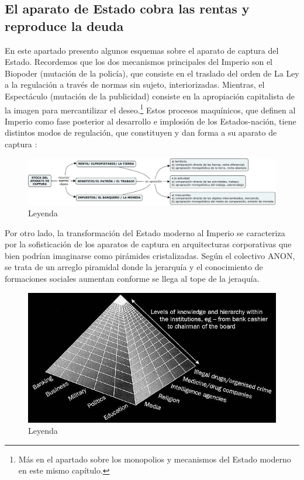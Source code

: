 \subsection{El aparato de Estado cobra las rentas y reproduce la deuda}
\label{sub:el-aparato-de-estado}

En este apartado presento algunos esquemas sobre el aparato de captura del Estado. Recordemos que los dos mecanismos principales del Imperio son el Biopoder (mutación de la policía), que consiste en el traslado del orden de La Ley a la regulación a través de normas sin sujeto, interiorizadas. Mientras, el Espectáculo (mutación de la publicidad) consiste en la apropiación capitalista de la imagen para mercantilizar el deseo.\footnote{Más en el apartado sobre los monopolios y mecanismos del Estado moderno en este mismo capítulo.} Estos procesos maquínicos, que definen al Imperio como fase posterior al desarrollo e implosión de los Estados-nación, tiene distintos modos de regulación, que constituyen y dan forma a su aparato de captura \autocite{deleuzeMilMesetasCapitalismo2002}:

\begin{figure}[htb]
  \centering
  \includegraphics[width=0.7\linewidth]{images/deleuze-captura.png}
  \caption{Leyenda}
  \label{fig:deleuze}
\end{figure}

Por otro lado, la transformación del Estado moderno al Imperio se caracteriza por la sofisticación de los aparatos de captura en arquitecturas corporativas que bien podrían imaginarse como pirámides cristalizadas. Según el colectivo ANON, se trata de un arreglo piramidal donde la jerarquía y el conocimiento de formaciones sociales aumentan conforme se llega al tope de la jeraquía.

\begin{figure}[htb]
  \centering
  \includegraphics[width=0.7\linewidth]{images/knowledge-hierarchy-piramid.png}
  \caption{Leyenda}
  \label{fig:hierarchy}
\end{figure}

